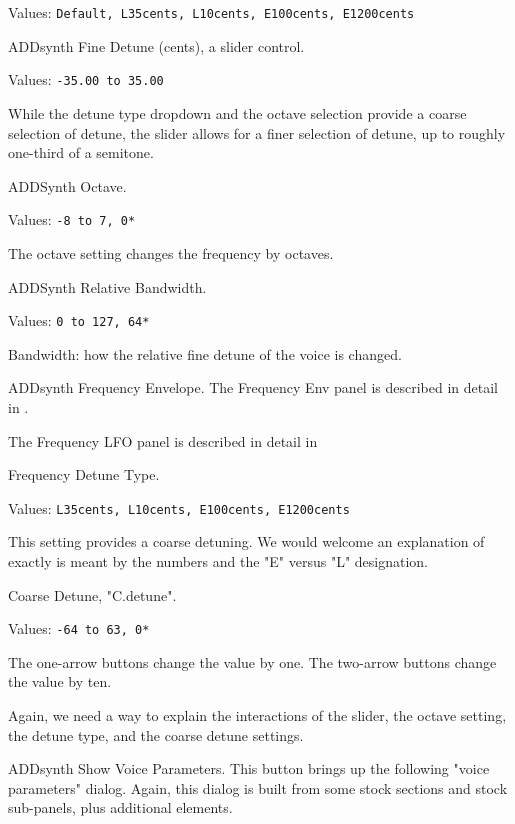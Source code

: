   Values: \texttt{Default, L35cents, L10cents, E100cents, E1200cents}

   ADDsynth Fine Detune (cents), a slider control.

   Values: \texttt{-35.00 to 35.00}

   While the detune type dropdown and the octave selection provide a coarse
   selection of detune, the slider allows for a finer selection of detune,
   up to roughly one-third of a semitone.

   ADDSynth Octave.

   Values: \texttt{-8 to 7, 0*}

   The octave setting changes the frequency by octaves.

   ADDSynth Relative Bandwidth.

   Values: \texttt{0 to 127, 64*}

   Bandwidth: how the relative fine detune of the voice is changed.

   ADDsynth Frequency Envelope.
   The Frequency Env panel is described in detail in
   .

   The Frequency LFO panel is described in detail in

   Frequency Detune Type.

   Values: \texttt{L35cents, L10cents, E100cents, E1200cents}

   This setting provides a coarse detuning.
   We would welcome an explanation of exactly is meant by the numbers and
   the "E" versus "L" designation.

   Coarse Detune, "C.detune".

   Values: \texttt{-64 to 63, 0*}

   The one-arrow buttons change the value by one.
   The two-arrow buttons change the value by ten.

   Again, we need a way to explain the interactions of the slider, the
   octave setting, the detune type, and the coarse detune settings.

   ADDsynth Show Voice Parameters.
   This button brings up the following "voice parameters" dialog.
   Again, this dialog is built from some stock sections and stock
   sub-panels, plus additional elements.

